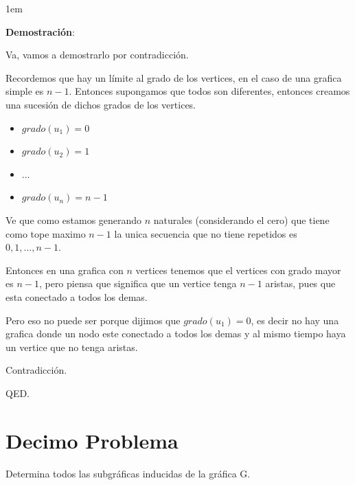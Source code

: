 \documentclass[journal,12pt,onecolumn]{IEEEtran}                %
\newenvironment{SmallIndentation}[1][0.75em]                    %
        {\begin{adjustwidth}{#1}{}\begin{footnotesize}}             %
        {\end{footnotesize}\end{adjustwidth}}                       %
\theoremstyle{break}                                            %
\begin{document}
        \begin{SmallIndentation}[1em]
            \textbf{Demostración}:

            Va, vamos a demostrarlo por contradicción.
            
            Recordemos que hay un límite al grado de los vertices, en el caso
            de una grafica simple es $n - 1$. Entonces supongamos que todos son diferentes, entonces 
            creamos una sucesión de dichos grados de los vertices.
            \begin{itemize}
                \item  $grado(u_1) = 0$
                \item  $grado(u_2) = 1$
                \item  $\dots$
                \item  $grado(u_n) = n - 1$
            \end{itemize}

            Ve que como estamos generando $n$ naturales (considerando el cero) que tiene como tope maximo $n -1$
            la unica secuencia que no tiene repetidos es $0, 1, \dots, n-1$.

            Entonces en una grafica con $n$ vertices tenemos que el vertices con grado 
            mayor es $n - 1$, pero piensa que significa que un vertice tenga $n - 1$ aristas, pues
            que esta conectado a todos los demas.

            Pero eso no puede ser porque dijimos que $grado(u_1) = 0$, es decir no hay una grafica donde un nodo
            este conectado a todos los demas y al mismo tiempo haya un vertice que no tenga aristas.

            Contradicción.

            QED.

        \end{SmallIndentation}

    \clearpage
    \section*{Decimo Problema}
        Determina todos las subgráficas inducidas de la gráfica G.
\end{document}
